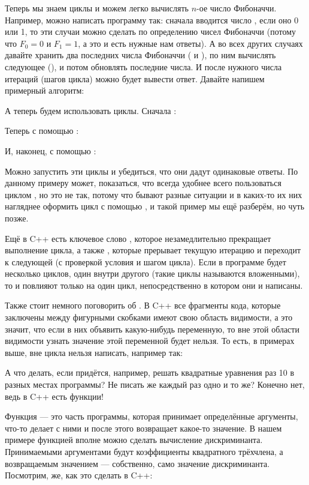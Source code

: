 Теперь мы знаем циклы и можем легко вычислять $n$-ое число Фибоначчи. Например, можно написать программу так: сначала вводится число , если оно 0 или 1, то эти случаи можно сделать по определению чисел Фибоначчи (потому что $F_0 = 0$ и $F_1 = 1$, а это и есть нужные нам ответы). А во всех других случаях давайте хранить два последних числа Фибоначчи ( и ), по ним вычислять следующее (), и потом обновлять последние числа. И после нужного числа итераций (шагов цикла) можно будет вывести ответ. Давайте напишем примерный алгоритм:


А теперь будем использовать циклы. Сначала :


Теперь с помощью :


И, наконец, с помощью :


Можно запустить эти циклы и убедиться, что они дадут одинаковые ответы. По данному примеру может, показаться, что всегда удобнее всего пользоваться циклом , но это не так, потому что бывают разные ситуации и в каких-то их них нагляднее оформить цикл с помощью , и такой пример мы ещё разберём, но чуть позже.

Ещё в C++ есть ключевое слово , которое незамедлительно прекращает выполнение цикла, а также , которые прерывает текущую итерацию и переходит к следующей (с проверкой условия и шагом цикла). Если в программе будет несколько циклов, один внутри другого (такие циклы называются вложенными), то  и  повлияют только на один цикл, непосредственно в котором они и написаны.

Также стоит немного поговорить об . В C++ все фрагменты кода, которые заключены между фигурными скобками имеют свою область видимости, а это значит, что если в них объявить какую-нибудь переменную, то вне этой области видимости узнать значение этой переменной будет нельзя. То есть, в примерах выше, вне цикла нельзя написать, например так:


А что делать, если придётся, например, решать квадратные уравнения раз 10 в разных местах программы? Не писать же каждый раз одно и то же? Конечно нет, ведь в C++ есть функции!

Функция — это часть программы, которая принимает определённые аргументы, что-то делает с ними и после этого возвращает какое-то значение.
В нашем примере функцией вполне можно сделать вычисление дискриминанта. Принимаемыми аргументами будут коэффициенты квадратного трёхчлена, а возвращаемым значением — собственно, само значение дискриминанта. Посмотрим, же, как это сделать в C++:

